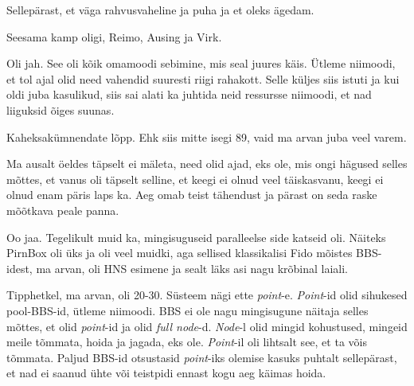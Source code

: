 
Sellepärast, et väga rahvusvaheline ja puha ja et oleks ägedam.

Seesama kamp oligi, Reimo, Ausing 
 ja Virk.
 
      

Oli jah. See oli kõik omamoodi sebimine, mis seal juures käis. Ütleme niimoodi, 
et tol ajal olid need vahendid suuresti riigi rahakott. Selle küljes siis 
istuti ja kui oldi juba kasulikud, siis sai alati ka juhtida neid ressursse 
niimoodi, et nad liiguksid õiges suunas. 


Kaheksakümnendate lõpp. Ehk siis mitte isegi 89, vaid ma arvan juba veel varem.
                 
Ma ausalt öeldes täpselt ei mäleta, need olid ajad, eks ole, mis ongi  hägused 
selles mõttes, et vanus oli täpselt selline, et keegi ei olnud veel  täiskasvanu, 
keegi ei olnud enam päris laps ka. Aeg omab teist tähendust ja pärast on seda 
raske mõõtkava peale panna.

                 
Oo jaa. Tegelikult muid ka, mingisuguseid paralleelse side katseid oli. Näiteks 
PirnBox oli üks ja oli veel muidki, aga sellised 
klassikalisi Fido  mõistes BBS-idest, ma arvan, oli HNS esimene ja sealt läks 
asi nagu krõbinal laiali.
                 
                 
Tipphetkel, ma arvan, oli 20-30. Süsteem nägi ette \emph{point}-e. 
\emph{Point}-id olid sihukesed pool-BBS-id, ütleme niimoodi. BBS ei ole nagu 
mingisugune näitaja selles mõttes, et olid \emph{point}-id ja olid \emph{full 
node}-d. \emph{Node}-l olid mingid kohustused, mingeid meile tõmmata, hoida ja 
jagada, eks ole. \emph{Point}-il oli lihtsalt see, et ta võis tõmmata. Paljud 
BBS-id otsustasid \emph{point}-iks  olemise kasuks puhtalt sellepärast, et nad 
ei saanud ühte või teistpidi ennast kogu aeg käimas hoida.
                 
